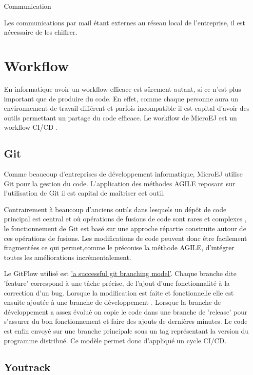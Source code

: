 \documentclass[french,a4paper,12pt]{report}
\begin{document}
Communication

Les communications par mail étant externes au réseau local de l’entreprise, il est nécessaire de les chiffrer.  

\section{Workflow}

En informatique avoir un workflow efficace est sûrement autant, si ce n’est plus important que de produire du code. En effet, comme chaque personne aura un environnement de travail différent et parfois incompatible il est capital d’avoir des outils permettant un partage du code efficace. Le workflow de MicroEJ est un workflow CI/CD .

\subsection{Git}

Comme beaucoup d'entreprises de développement informatique, MicroEJ utilise \href{https://git-scm.com/}{Git} pour la gestion du code. L'application des méthodes AGILE reposant sur l'utilisation de Git il est capital de maîtriser cet outil.

Contrairement à beaucoup d'anciens outils dans lesquels un dépôt de code principal est central et où opérations de fusions de code sont rares et complexes , le fonctionnement de Git est basé sur une approche répartie construite autour de ces opérations de fusions. Les modifications de code peuvent donc être facilement fragmentées ce qui permet,comme le préconise la méthode AGILE, d'intégrer toutes les améliorations incrémentalement. 

Le GitFlow utilisé est \href{https://nvie.com/posts/a-successful-git-branching-model/}{'a successful git branching model'}. Chaque branche dite 'feature' correspond à une tâche précise, de l'ajout d'une fonctionnalité à la correction d'un bug. Lorsque la modification est faite et fonctionnelle elle est ensuite ajoutée à une branche de développement . Lorsque la branche de développement a assez évolué on copie le code dans une branche de 'release' pour s'assurer du bon fonctionnement et faire des ajouts de dernières minutes. Le code est enfin envoyé sur une branche principale sous un tag représentant la version du programme distribué.
Ce modèle permet donc d'appliqué un cycle CI/CD.

\subsection{Youtrack}
\end{document}

